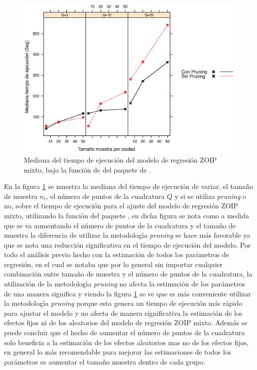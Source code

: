 \begin{figure}
	\begin{center}
		\includegraphics[scale=0.6]{time_mix_ZOIP.eps}	
		\caption{Mediana del tiempo de ejecuci\'{o}n del modelo de regresi\'{o}n ZOIP mixto, bajo la funci\'{o}n de  del paquete  de .}
		\label{time_mix_ZOIP}
	\end{center}
\end{figure}

En la figura \ref{time_mix_ZOIP} se muestra la mediana del tiempo de ejecuci\'{o}n de variar, el tama\~{n}o de muestra $n_i$, el n\'{u}mero de puntos de la cuadratura $Q$ y si se utiliza \textit{pruning} o no, sobre el tiempo de ejecuci\'{o}n para el ajuste del modelo de regresi\'{o}n ZOIP mixto, utilizando la funci\'{o}n  del paquete , en dicha figura se nota como a medida que se va aumentando el n\'{u}mero de puntos de la cuadratura y el tama\~{n}o de muestra la diferencia de utilizar la metodolog\'{\i}a \textit{pruning} se hace m\'{a}s favorable ya que se nota una reducci\'{o}n significativa en el tiempo de ejecuci\'{o}n del modelo. Por todo el an\'{a}lisis previo hecho con la estimaci\'{o}n de todos los par\'{a}metros de regresi\'{o}n, en el cual se notaba que por lo general sin importar cualquier combinaci\'{o}n entre tama\~{n}o de muestra y el n\'{u}mero de puntos de la cuadratura, la utilizaci\'{o}n de la metodolog\'{\i}a \textit{pruning} no afecta la estimaci\'{o}n de los par\'{a}metros de una manera significa y viendo la figura \ref{time_mix_ZOIP} se ve que es m\'{a}s conveniente utilizar la metodolog\'{\i}a \textit{pruning} porque esta genera un tiempo de ejecuci\'{o}n m\'{a}s r\'{a}pido para ajustar el modelo y no afecta de manera significativa la estimaci\'{o}n de los efectos fijos ni de los aleatorios del modelo de regresi\'{o}n ZOIP mixto. Adem\'{a}s se puede concluir que el hecho de aumentar el n\'{u}mero de puntos de la cuadratura solo beneficia a la estimaci\'{o}n de los efectos aleatorios mas no de los efectos fijos, en general lo m\'{a}s recomendable para mejorar las estimaciones de todos los par\'{a}metros es aumentar el tama\~{n}o muestra dentro de cada grupo.